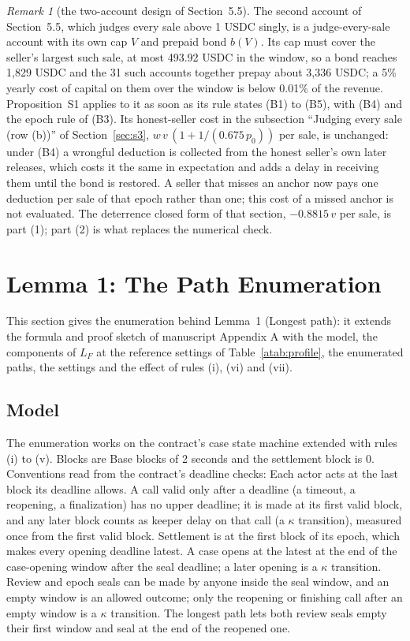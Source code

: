 \documentclass[10pt,a4paper]{article}
\theoremstyle{plain}
\theoremstyle{remark}
\newtheorem{sremark}{Remark}
\begin{document}
\begin{sremark}[the two-account design of Section~5.5]\label{rem:rowb-two}
The second account of Section~5.5, which judges every sale above 1 USDC singly, is a judge-every-sale account with its own cap $V$ and prepaid bond $b(V)$. Its cap must cover the seller's largest such sale, at most 493.92 USDC in the window, so a bond reaches 1,829 USDC and the 31 such accounts together prepay about 3,336 USDC; a 5\% yearly cost of capital on them over the window is below 0.01\% of the revenue. Proposition~S1 applies to it as soon as its rule states (B1) to (B5), with (B4) and the epoch rule of (B3). Its honest-seller cost in the subsection ``Judging every sale (row (b))'' of Section~\ref{sec:s3}, $w\,v\,(1+1/(0.675\,p_0))$ per sale, is unchanged: under (B4) a wrongful deduction is collected from the honest seller's own later releases, which costs it the same in expectation and adds a delay in receiving them until the bond is restored. A seller that misses an anchor now pays one deduction per sale of that epoch rather than one; this cost of a missed anchor is not evaluated. The deterrence closed form of that section, $-0.8815\,v$ per sale, is part (1); part (2) is what replaces the numerical check.
\end{sremark}

\section{Lemma 1: The Path Enumeration}
\label{sec:s2}

This section gives the enumeration behind Lemma~1 (Longest path): it extends the formula and proof sketch of manuscript Appendix A with the model, the components of $L_F$ at the reference settings of Table~\ref{atab:profile}, the enumerated paths, the settings and the effect of rules (i), (vi) and (vii).

\subsection{Model}

The enumeration works on the contract's case state machine extended with rules (i) to (v). Blocks are Base blocks of 2 seconds and the settlement block is 0. Conventions read from the contract's deadline checks:
Each actor acts at the last block its deadline allows. A call valid only after a deadline (a timeout, a reopening, a finalization) has no upper deadline; it is made at its first valid block, and any later block counts as keeper delay on that call (a $\kappa$ transition), measured once from the first valid block. Settlement is at the first block of its epoch, which makes every opening deadline latest. A case opens at the latest at the end of the case-opening window after the seal deadline; a later opening is a $\kappa$ transition. Review and epoch seals can be made by anyone inside the seal window, and an empty window is an allowed outcome; only the reopening or finishing call after an empty window is a $\kappa$ transition. The longest path lets both review seals empty their first window and seal at the end of the reopened one.
\end{document}
